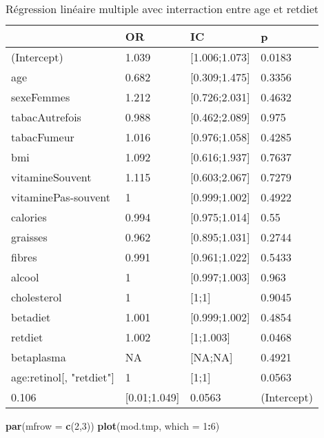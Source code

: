 \documentclass[]{article}
\newenvironment{Shaded}{\begin{snugshade}}{\end{snugshade}}
\newcommand{\KeywordTok}[1]{\textcolor[rgb]{0.13,0.29,0.53}{\textbf{#1}}}
\newcommand{\DataTypeTok}[1]{\textcolor[rgb]{0.13,0.29,0.53}{#1}}
\newcommand{\DecValTok}[1]{\textcolor[rgb]{0.00,0.00,0.81}{#1}}
\newcommand{\OperatorTok}[1]{\textcolor[rgb]{0.81,0.36,0.00}{\textbf{#1}}}
\newcommand{\NormalTok}[1]{#1}
\begin{document}
\begin{table}

\caption{\label{tab:unnamed-chunk-83}Régression linéaire multiple avec interraction entre age et retdiet}
\centering
\begin{tabular}[t]{l|l|l|l}
\hline
  & OR & IC & p\\
\hline
\rowcolor[HTML]{BBD2E1}  (Intercept) & 1.039 & [1.006;1.073] & 0.0183\\
\hline
age & 0.682 & [0.309;1.475] & 0.3356\\
\hline
\rowcolor[HTML]{BBD2E1}  sexeFemmes & 1.212 & [0.726;2.031] & 0.4632\\
\hline
tabacAutrefois & 0.988 & [0.462;2.089] & 0.975\\
\hline
\rowcolor[HTML]{BBD2E1}  tabacFumeur & 1.016 & [0.976;1.058] & 0.4285\\
\hline
bmi & 1.092 & [0.616;1.937] & 0.7637\\
\hline
\rowcolor[HTML]{BBD2E1}  vitamineSouvent & 1.115 & [0.603;2.067] & 0.7279\\
\hline
vitaminePas-souvent & 1 & [0.999;1.002] & 0.4922\\
\hline
\rowcolor[HTML]{BBD2E1}  calories & 0.994 & [0.975;1.014] & 0.55\\
\hline
graisses & 0.962 & [0.895;1.031] & 0.2744\\
\hline
\rowcolor[HTML]{BBD2E1}  fibres & 0.991 & [0.961;1.022] & 0.5433\\
\hline
alcool & 1 & [0.997;1.003] & 0.963\\
\hline
\rowcolor[HTML]{BBD2E1}  cholesterol & 1 & [1;1] & 0.9045\\
\hline
betadiet & 1.001 & [0.999;1.002] & 0.4854\\
\hline
\rowcolor[HTML]{BBD2E1}  retdiet & 1.002 & [1;1.003] & 0.0468\\
\hline
betaplasma & NA & [NA;NA] & 0.4921\\
\hline
\rowcolor[HTML]{BBD2E1}  age:retinol[, "retdiet"] & 1 & [1;1] & 0.0563\\
\hline
0.106 & [0.01;1.049] & 0.0563 & (Intercept)\\
\hline
\end{tabular}
\end{table}

\begin{Shaded}
\begin{Highlighting}[]
\KeywordTok{par}\NormalTok{(}\DataTypeTok{mfrow =} \KeywordTok{c}\NormalTok{(}\DecValTok{2}\NormalTok{,}\DecValTok{3}\NormalTok{))}
\KeywordTok{plot}\NormalTok{(mod.tmp, }\DataTypeTok{which =} \DecValTok{1}\OperatorTok{:}\DecValTok{6}\NormalTok{)}
\end{Highlighting}
\end{Shaded}
\end{document}
